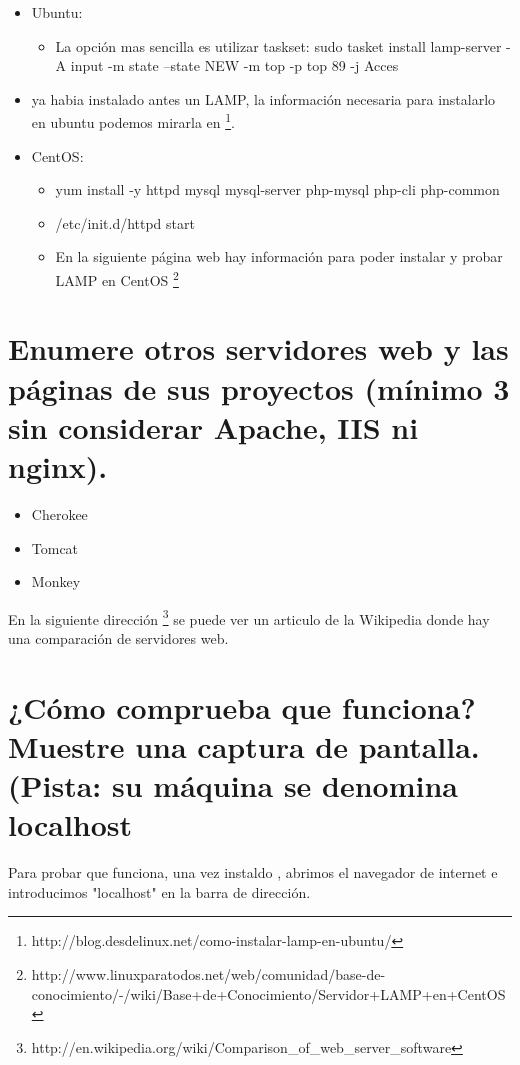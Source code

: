 \begin{itemize}
\item Ubuntu:
	\begin{itemize}
	\item La opción mas sencilla es utilizar taskset:
	sudo tasket install lamp-server
	- A input -m state --state NEW -m top -p top 89 -j Acces
	\end{itemize}
	\item ya habia instalado antes un LAMP, la información necesaria para instalarlo en ubuntu podemos mirarla en \footnote{http://blog.desdelinux.net/como-instalar-lamp-en-ubuntu/}.
\item  CentOS:
	\begin{itemize}
	\item yum install -y httpd mysql mysql-server php-mysql php-cli php-common
	\item /etc/init.d/httpd start
	\item En la siguiente página web hay información para poder instalar y probar LAMP en CentOS  \footnote{http://www.linuxparatodos.net/web/comunidad/base-de-conocimiento/-/wiki/Base+de+Conocimiento/Servidor+LAMP+en+CentOS}
	\end{itemize}
	


\end{itemize}



\newpage

\section{ Enumere otros servidores web y las páginas de sus proyectos (mínimo 3 sin considerar Apache, IIS ni nginx).}

\begin{itemize}
\item Cherokee
\item Tomcat
\item Monkey
\end{itemize}

En la siguiente dirección \footnote{http://en.wikipedia.org/wiki/Comparison\_of\_web\_server\_software} se puede ver un articulo de la Wikipedia donde hay una comparación de servidores web.



\section{¿Cómo comprueba que funciona? Muestre una captura de pantalla. (Pista: su máquina se denomina localhost}
Para probar que funciona, una vez instaldo , abrimos el navegador de internet e introducimos "localhost" en la barra de dirección.

